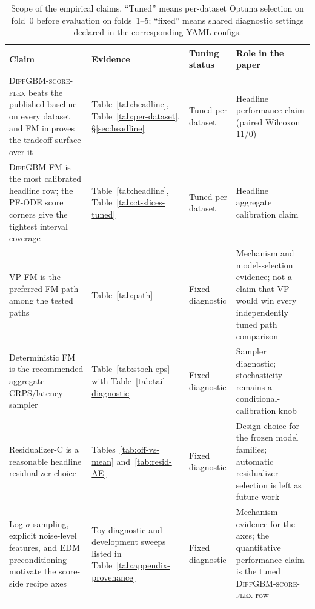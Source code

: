 \documentclass{article}
\begin{document}
\begin{table}[!h]
  \centering
  \caption{Scope of the empirical claims. ``Tuned'' means per-dataset Optuna selection on fold~0 before evaluation on folds~1--5; ``fixed'' means shared diagnostic settings declared in the corresponding YAML configs.}\label{tab:claim-map}
  \scriptsize
  \begin{tabular}{@{}p{}p{}p{}p{}@{}}
    \toprule
    Claim & Evidence & Tuning status & Role in the paper \\
    \midrule
    \textsc{DiffGBM-score-flex} beats the published baseline on every dataset and \textsc{FM} improves the tradeoff surface over it & Table~\ref{tab:headline}, Table~\ref{tab:per-dataset}, \S\ref{sec:headline} & Tuned per dataset & Headline performance claim (paired Wilcoxon $11/0$) \\
    \textsc{DiffGBM-FM} is the most calibrated headline row; the PF-ODE score corners give the tightest interval coverage & Table~\ref{tab:headline}, Table~\ref{tab:ct-slices-tuned} & Tuned per dataset & Headline aggregate calibration claim \\
    VP-FM is the preferred FM path among the tested paths & Table~\ref{tab:path} & Fixed diagnostic & Mechanism and model-selection evidence; not a claim that VP would win every independently tuned path comparison \\
    Deterministic FM is the recommended aggregate CRPS/latency sampler & Table~\ref{tab:stoch-eps} with Table~\ref{tab:tail-diagnostic} & Fixed diagnostic & Sampler diagnostic; stochasticity remains a conditional-calibration knob \\
    Residualizer-C is a reasonable headline residualizer choice & Tables~\ref{tab:off-vs-mean} and~\ref{tab:resid-AE} & Fixed diagnostic & Design choice for the frozen model families; automatic residualizer selection is left as future work \\
    Log-$\sigma$ sampling, explicit noise-level features, and EDM preconditioning motivate the score-side recipe axes & Toy diagnostic and development sweeps listed in Table~\ref{tab:appendix-provenance} & Fixed diagnostic & Mechanism evidence for the axes; the quantitative performance claim is the tuned \textsc{DiffGBM-score-flex} row \\
    \bottomrule
  \end{tabular}
\end{table}
\end{document}
